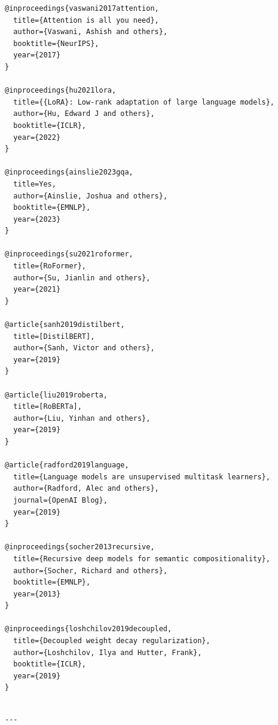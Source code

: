 \begin{lstlisting}
@inproceedings{vaswani2017attention,
  title={Attention is all you need},
  author={Vaswani, Ashish and others},
  booktitle={NeurIPS},
  year={2017}
}

@inproceedings{hu2021lora,
  title={{LoRA}: Low-rank adaptation of large language models},
  author={Hu, Edward J and others},
  booktitle={ICLR},
  year={2022}
}

@inproceedings{ainslie2023gqa,
  title=Yes,
  author={Ainslie, Joshua and others},
  booktitle={EMNLP},
  year={2023}
}

@inproceedings{su2021roformer,
  title={RoFormer},
  author={Su, Jianlin and others},
  year={2021}
}

@article{sanh2019distilbert,
  title=[DistilBERT],
  author={Sanh, Victor and others},
  year={2019}
}

@article{liu2019roberta,
  title=[RoBERTa],
  author={Liu, Yinhan and others},
  year={2019}
}

@article{radford2019language,
  title={Language models are unsupervised multitask learners},
  author={Radford, Alec and others},
  journal={OpenAI Blog},
  year={2019}
}

@inproceedings{socher2013recursive,
  title={Recursive deep models for semantic compositionality},
  author={Socher, Richard and others},
  booktitle={EMNLP},
  year={2013}
}

@inproceedings{loshchilov2019decoupled,
  title={Decoupled weight decay regularization},
  author={Loshchilov, Ilya and Hutter, Frank},
  booktitle={ICLR},
  year={2019}
}
\end{lstlisting}
\begin{lstlisting}

---
\end{lstlisting}
